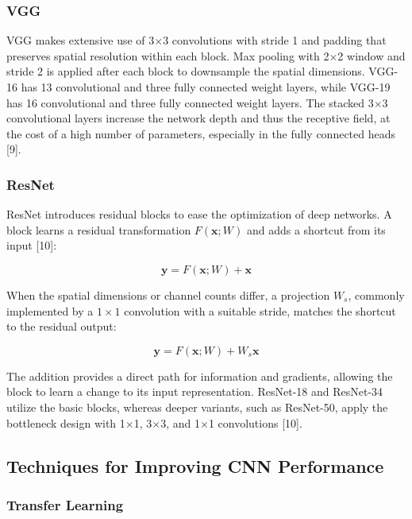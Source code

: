 \subsubsection{VGG}\label{theory:2.5.2}

VGG makes extensive use of 3\(\times\)3 convolutions with stride 1 and padding that preserves spatial resolution within each block. Max pooling with 2\(\times\)2 window and stride 2 is applied after each block to downsample the spatial dimensions. VGG-16 has 13 convolutional and three fully connected weight layers, while VGG-19 has 16 convolutional and three fully connected weight layers. The stacked 3\(\times\)3 convolutional layers increase the network depth and thus the receptive field, at the cost of a high number of parameters, especially in the fully connected heads [9].

\subsubsection{ResNet}\label{theory:2.5.3}

ResNet introduces residual blocks to ease the optimization of deep networks. A block learns a residual transformation \(F(\boldsymbol{x};W)\) and adds a shortcut from its input [10]:

\[
\boldsymbol{y}=F(\boldsymbol{x};W)+\boldsymbol{x}
\]

When the spatial dimensions or channel counts differ, a projection \({W}_{s}\), commonly implemented by a \(1\times 1\) convolution with a suitable stride, matches the shortcut to the residual output:

\[
\boldsymbol{y}=F(\boldsymbol{x};W)+{W}_{s}\boldsymbol{x}
\]

The addition provides a direct path for information and gradients, allowing the block to learn a change to its input representation. ResNet-18 and ResNet-34 utilize the basic blocks, whereas deeper variants, such as ResNet-50, apply the bottleneck design with 1\(\times\)1, 3\(\times\)3, and 1\(\times\)1 convolutions [10].

\subsection{Techniques for Improving CNN Performance}\label{theory:2.6}

\subsubsection{Transfer Learning}\label{theory:2.6.1}

